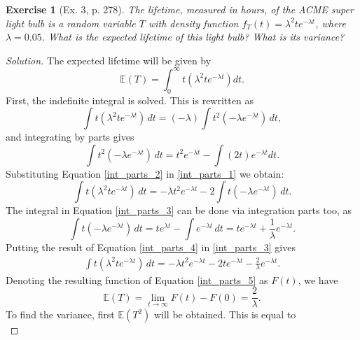 \documentclass[letterpaper, 10 pt, conference]{article}
\newtheorem{ex}{Exercise}
\newcommand\E{\ensuremath{\mathbb{E}}}
\begin{document}
\begin{ex}[Ex. 3, p. 278]
	The lifetime, measured in hours, of the ACME super light bulb is a random variable $T$ with density function $f_T (t) = \lambda^2 t e^{-\lambda t}$, where $\lambda = 0.05$. What is the expected lifetime of this light bulb? What is its variance?
\end{ex}
\begin{proof}[Solution]
	The expected lifetime will be given by
	\begin{equation}
		\E(T) = \int_{0}^{\infty} t (\lambda^2 t e ^{-\lambda t}) dt.
	\end{equation}
First, the indefinite integral is solved. This is rewritten as
	\begin{equation} \label{int_parts_1}
		\int t (\lambda^2 t e ^{-\lambda t}) \, dt = (-\lambda) \int t^2 (-\lambda e ^{-\lambda t}) \, dt,
	\end{equation}
	and integrating by parts gives
	\begin{equation} \label{int_parts_2}
		\int t^2 (-\lambda e ^{-\lambda t}) \, dt = t^2 e^{-\lambda t} - \int (2t) e^{-\lambda t} dt.
	\end{equation}
	Substituting Equation \ref{int_parts_2} in \ref{int_parts_1} we obtain:
	\begin{equation}\label{int_parts_3}
			\int t (\lambda^2 t e ^{-\lambda t}) \, dt = -\lambda t^2 e^{-\lambda t} - 2 \int t (-\lambda e^{-\lambda t}) \, dt.
	\end{equation}
	The integral in Equation \ref{int_parts_3} can be done via integration parts too, as
	\begin{equation} \label{int_parts_4}
		\int t (-\lambda e^{- \lambda t} ) \, dt = t e^{\lambda t} - \int e^{-\lambda t} \, dt
		= t e^{- \lambda t} + \frac{1}{\lambda} e^{-\lambda t}.
	\end{equation}
	Putting the result of Equation \ref{int_parts_4} in \ref{int_parts_3} gives
	\begin{align}\label{int_parts_5}
		\int t (\lambda^2 t e ^{-\lambda t}) \, dt = -\lambda t^2 e^{-\lambda t} - 2 t e^{-\lambda t} - \frac{2}{\lambda} e^{-\lambda t}.
	\end{align}
	Denoting the resulting function of Equation \ref{int_parts_5} as $F(t)$, we have 
	\begin{equation}
		\E(T) = \lim_{t \longrightarrow \infty} F(t) - F(0) = \frac{2}{\lambda}.
	\end{equation}
	To find the variance, first $\E(T^2)$ will be obtained. This is equal to 
	\begin{equation}

\end{equation}
\end{proof}
\end{document}
